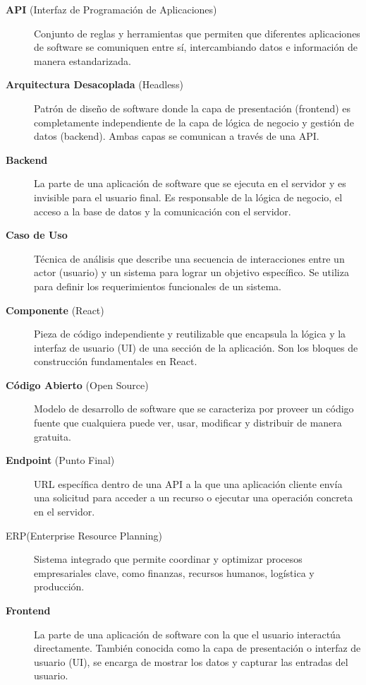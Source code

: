 \documentclass[12pt,letterpaper,spanish]{report}
\begin{document}
\begin{description}
 
  \item[\textbf{API} (Interfaz de Programación de Aplicaciones)] Conjunto de reglas y herramientas que permiten que diferentes aplicaciones de software se comuniquen entre sí, intercambiando datos e información de manera estandarizada.

  \item[\textbf{Arquitectura Desacoplada} (Headless)] Patrón de diseño de software donde la capa de presentación (frontend) es completamente independiente de la capa de lógica de negocio y gestión de datos (backend). Ambas capas se comunican a través de una API.

  \item[\textbf{Backend}] La parte de una aplicación de software que se ejecuta en el servidor y es invisible para el usuario final. Es responsable de la lógica de negocio, el acceso a la base de datos y la comunicación con el servidor.

  \item[\textbf{Caso de Uso}] Técnica de análisis que describe una secuencia de interacciones entre un actor (usuario) y un sistema para lograr un objetivo específico. Se utiliza para definir los requerimientos funcionales de un sistema.

  \item[\textbf{Componente} (React)] Pieza de código independiente y reutilizable que encapsula la lógica y la interfaz de usuario (UI) de una sección de la aplicación. Son los bloques de construcción fundamentales en React.

  \item[\textbf{Código Abierto} (Open Source)] Modelo de desarrollo de software que se caracteriza por proveer un código fuente que cualquiera puede ver, usar, modificar y distribuir de manera gratuita.
      
  \item[\textbf{Endpoint} (Punto Final)] URL específica dentro de una API a la que una aplicación cliente envía una solicitud para acceder a un recurso o ejecutar una operación concreta en el servidor.
    
      
  \item[ERP(Enterprise Resource Planning)]  Sistema integrado que permite coordinar y 
        optimizar procesos empresariales clave, como finanzas, recursos humanos, logística y producción. 
    
  \item[\textbf{Frontend}] La parte de una aplicación de software con la que el usuario interactúa directamente. También conocida como la capa de presentación o interfaz de usuario (UI), se encarga de mostrar los datos y capturar las entradas del usuario.
  

\end{description}
\end{document}
